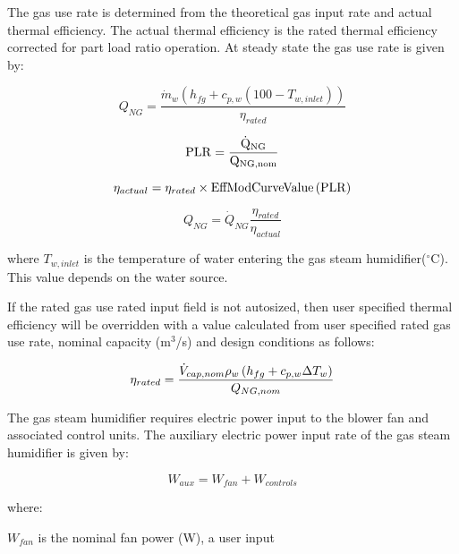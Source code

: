 The gas use rate is determined from the theoretical gas input rate and actual thermal efficiency. The actual thermal efficiency is the rated thermal efficiency corrected for part load ratio operation. At steady state the gas use rate is given by:

\begin{equation}
Q_{NG} = \frac{\dot{m}_w \left(h_{fg}+c_{p,w}\left(100-T_{w,inlet}\right)\right)}{\eta_{rated}}
\end{equation}

\begin{equation}
\rm{PLR} = \frac{\dot{Q}_{NG}}{Q_{NG,nom}}
\end{equation}

\begin{equation}
\eta_{actual} = \eta_{rated} \times \rm{EffModCurveValue}\left(PLR\right)
\end{equation}

\begin{equation}
Q_{NG} = \dot{Q}_{NG}\frac{\eta_{rated}}{\eta_{actual}}
\end{equation}

where \({T_{w,inlet}}\) is the temperature of water entering the gas steam humidifier(\(^{\circ}\)C). This value depends on the water source.

If the rated gas use rated input field is not autosized, then user specified thermal efficiency will be overridden with a value calculated from user specified rated gas use rate, nominal capacity (m\(^3\)/s) and design conditions as follows:

\begin{equation}
 \eta_{rated} = \frac{\dot{V}_{cap,nom} \rho_w \left(h_{fg}+c_{p,w}\Delta T_w\right)}{Q_{NG,nom}}
\end{equation}

The gas steam humidifier requires electric power input to the blower fan and associated control units. The auxiliary electric power input rate of the gas steam humidifier is given by:

\begin{equation}
W_{aux} = W_{fan} + W_{controls}
\end{equation}

where:

\({W_{fan}}\) is the nominal fan power (W), a user input

